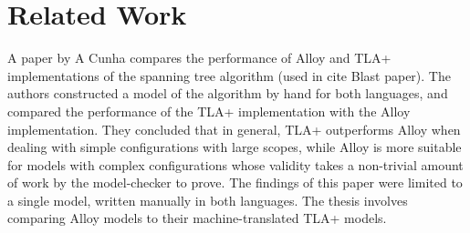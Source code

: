 \chapter{Related Work}







A paper \cite{hand-comparison} by A Cunha compares the performance of Alloy and TLA+ implementations of the spanning tree algorithm (used in cite Blast paper). The authors constructed a model of the algorithm by hand for both languages, and compared the performance of the TLA+ implementation with the Alloy implementation. They concluded that in general, TLA+ outperforms Alloy when dealing with simple configurations with large scopes, while Alloy is more suitable for models with complex configurations whose validity takes a non-trivial amount of work by the model-checker to prove. The findings of this paper were limited to a single model, written manually in both languages. The thesis involves comparing Alloy models to their machine-translated TLA+ models.